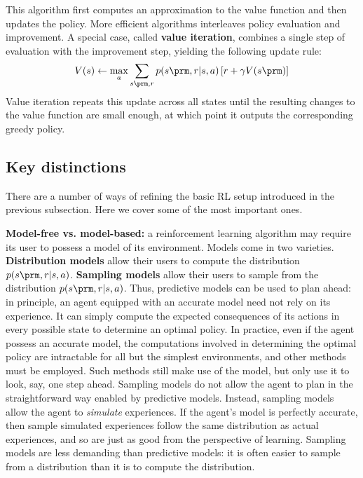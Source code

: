 \documentclass{my-tufte}
\begin{document}
This algorithm first computes an approximation to the value function and then updates the policy.
More efficient algorithms interleaves policy evaluation and improvement.
A special case, called \textbf{value iteration}, combines a single step of evaluation with the improvement step, yielding the following update rule:
\begin{align*}
	V(s) \leftarrow \max_a \sum_{s\prm, r} p(s\prm, r | s, a) \left [ r + \gamma V(s\prm) \right ]
\end{align*}
Value iteration repeats this update across all states until the resulting changes to the value function are small enough, at which point it outputs the corresponding greedy policy.



\subsection{Key distinctions}

There are a number of ways of refining the basic RL setup introduced in the previous subsection.
Here we cover some of the most important ones.

\textbf{Model-free vs. model-based:} a reinforcement learning algorithm may require its user to possess a model of its environment.
Models come in two varieties.
\textbf{Distribution models} allow their users to compute the distribution $p(s\prm, r | s, a)$.
\textbf{Sampling models} allow their users to sample from the distribution $p(s\prm, r | s, a)$.
Thus, predictive models can be used to plan ahead: in principle, an agent equipped with an accurate model need not rely on its experience.
It can simply compute the expected consequences of its actions in every possible state to determine an optimal policy.
In practice, even if the agent possess an accurate model, the computations involved in determining the optimal policy are intractable for all but the simplest environments, and other methods must be employed.
Such methods still make use of the model, but only use it to look, say, one step ahead.
Sampling models do not allow the agent to plan in the straightforward way enabled by predictive models.
Instead, sampling models allow the agent to \emph{simulate} experiences.
If the agent's model is perfectly accurate, then sample simulated experiences follow the same distribution as actual experiences, and so are just as good from the perspective of learning.
Sampling models are less demanding than predictive models: it is often easier to sample from a distribution than it is to compute the distribution.
\end{document}
